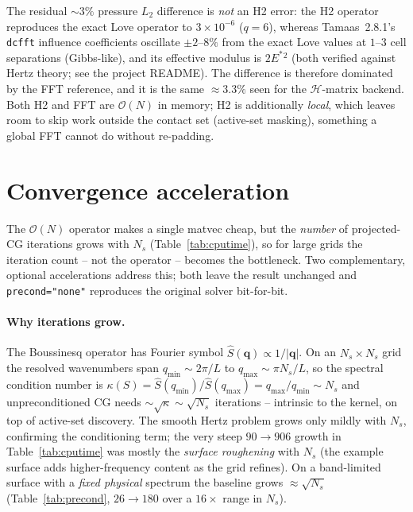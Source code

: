 \documentclass[11pt,a4paper]{article}
\newcommand{\Es}{E^{*}}
\newcommand{\Order}{\mathcal{O}}
\newcommand{\abs}[1]{\left\lvert #1 \right\rvert}
\begin{document}
The residual $\sim3\%$ pressure $L_2$ difference is \emph{not} an H2 error:
the H2 operator reproduces the exact Love operator to $3\times10^{-6}$
($q=6$), whereas Tamaas~2.8.1's \texttt{dcfft} influence coefficients
oscillate $\pm2$--$8\%$ from the exact Love values at $1$--$3$ cell
separations (Gibbs-like), and its effective modulus is $2\Es{}^2$ (both
verified against Hertz theory; see the project README). The difference is
therefore dominated by the FFT reference, and it is the same $\approx3.3\%$
seen for the $\mathcal{H}$-matrix backend. Both H2 and FFT are $\Order(N)$ in
memory; H2 is additionally \emph{local}, which leaves room to skip work
outside the contact set (active-set masking), something a global FFT cannot
do without re-padding.

\section{Convergence acceleration}
\label{sec:accel}

The $\Order(N)$ operator makes a single matvec cheap, but the \emph{number} of
projected-CG iterations grows with $N_s$ (Table~\ref{tab:cputime}), so for large
grids the iteration count -- not the operator -- becomes the bottleneck. Two
complementary, optional accelerations address this; both leave the result
unchanged and \texttt{precond="none"} reproduces the original solver bit-for-bit.

\paragraph{Why iterations grow.}
The Boussinesq operator has Fourier symbol $\widehat S(\mathbf q)\propto
1/\abs{\mathbf q}$. On an $N_s\times N_s$ grid the resolved wavenumbers span
$q_{\min}\sim 2\pi/L$ to $q_{\max}\sim\pi N_s/L$, so the spectral condition number
is $\kappa(S)=\widehat S(q_{\min})/\widehat S(q_{\max})=q_{\max}/q_{\min}\sim N_s$
and unpreconditioned CG needs $\sim\sqrt{\kappa}\sim\sqrt{N_s}$ iterations --
intrinsic to the kernel, on top of active-set discovery. The smooth Hertz problem
grows only mildly with $N_s$, confirming the conditioning term; the very steep
$90\!\to\!906$ growth in Table~\ref{tab:cputime} was mostly the
\emph{surface roughening} with $N_s$ (the example surface adds higher-frequency
content as the grid refines). On a band-limited surface with a \emph{fixed
physical} spectrum the baseline grows $\approx\sqrt{N_s}$
(Table~\ref{tab:precond}, $26\!\to\!180$ over a $16\times$ range in $N_s$).
\end{document}
